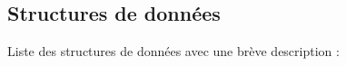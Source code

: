 \subsection{Structures de données}
Liste des structures de données avec une brève description \+:\begin{DoxyCompactList}
\item{}
\end{DoxyCompactList}
